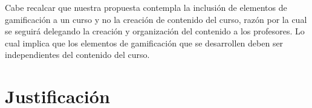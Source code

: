 \noindent Cabe recalcar que nuestra propuesta contempla la inclusión de elementos de
 gamificación a un curso y no la creación de contenido del curso, razón por la cual 
 se seguirá delegando la creación y organización del contenido a los profesores. Lo 
 cual implica que los elementos de gamificación que se desarrollen deben ser 
 independientes del contenido del curso.

\section{Justificación} \label{sec:justificacion} %






